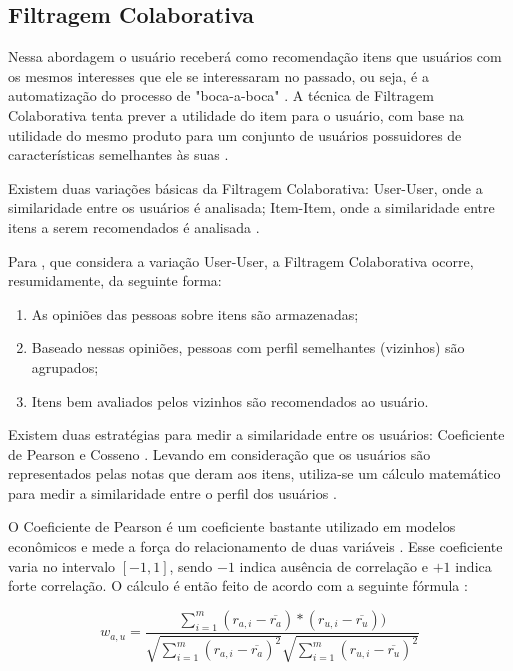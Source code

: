 \subsection{Filtragem Colaborativa}

Nessa abordagem o usuário receberá como recomendação itens que usuários com os mesmos interesses que ele se
interessaram no passado, ou seja, é a automatização do processo de "boca-a-boca" \cite{jannach2010recommender}. A
técnica de Filtragem Colaborativa tenta prever a utilidade  do item para o usuário, com base na utilidade do mesmo
produto para um conjunto de usuários  possuidores de características semelhantes às suas \cite{jannach2010recommender}.

Existem duas variações básicas da Filtragem Colaborativa: User-User, onde a similaridade entre os usuários é analisada;
Item-Item, onde a similaridade entre itens a serem recomendados é analisada \cite{jannach2010recommender}.

Para , que considera a variação User-User, a Filtragem Colaborativa ocorre,
resumidamente, da seguinte forma:

\begin{enumerate}
\item As opiniões das pessoas sobre itens são armazenadas;
\item Baseado nessas opiniões, pessoas com perfil semelhantes (vizinhos) são agrupados;
\item Itens bem avaliados pelos vizinhos são recomendados ao usuário.
\end{enumerate}

Existem duas estratégias para medir a similaridade entre os usuários: Coeficiente de Pearson e Cosseno
\cite{torres2004personalizaccao}. Levando em consideração que os usuários são representados pelas notas que deram aos
itens, utiliza-se um cálculo matemático para medir a similaridade entre o perfil dos usuários
\cite{torres2004personalizaccao}.

O Coeficiente de Pearson é um coeficiente bastante utilizado em modelos econômicos e mede a força do relacionamento
de duas variáveis \cite{torres2004personalizaccao}. Esse coeficiente varia no intervalo $[-1, 1]$, sendo $-1$ indica
ausência de correlação e $+1$ indica forte correlação. O cálculo é então feito de acordo com a seguinte fórmula
\cite{torres2004personalizaccao}:

\begin{equation}
  w_{a,u} = \frac{\sum_{i=1}^{m}(r_{a,i} - \overline{r_a})*(r_{u,i} - \overline{r_u}))}{\sqrt{\sum_{i=1}^{m}(r_{a,i} - \overline{r_a})^2} \sqrt{\sum_{i=1}^{m}(r_{u,i} - \overline{r_u})^2}}
  \label{eq:pearson}
\end{equation}

